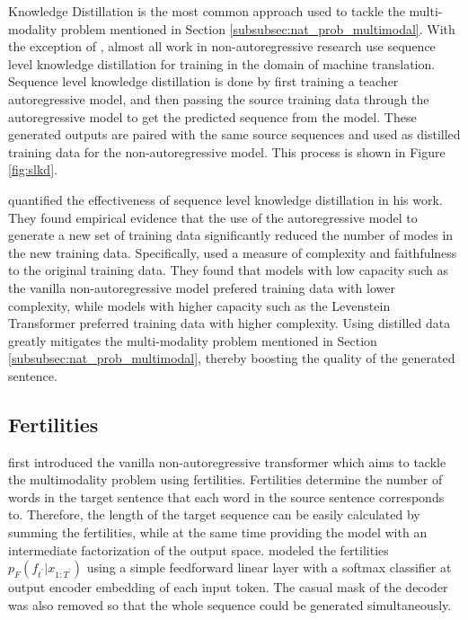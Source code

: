 Knowledge Distillation is the most common approach used to tackle the multi-modality problem mentioned in Section \ref{subsubsec:nat_prob_multimodal}. With the exception of \cite{ran_learning_to_recover_2020}, almost all work in non-autoregressive research \cite{ren_study_2020_comma, gu_non-autoregressive_2018, gu_levenshtein_2019, guo_non-autoregressive_2020_image_captioning, bao_non-autoregressive_2019_position_learning, wang_semi-autoregressive_2018,saharia_non-autoregressive_2020_latent_alignment, chan_kermit_2019, chan_multilingual_kermit, ghazvininejad_mask-predict_2019,stern_insertion_2019, zhou_improving_2020_with_monolingual_data, ran_guiding_2020_reordering, ma_flowseq_2019, qian_glancing_2020, guo_fine-tuning_2019_curriculum, ding_context-aware_2020} use sequence level knowledge distillation \cite{kim_sequence-level_2016_knowledge_distillation} for training in the domain of machine translation. Sequence level knowledge distillation is done by first training a teacher autoregressive model, and then passing the source training data through the autoregressive model to get the predicted sequence from the model. These generated outputs are paired with the same source sequences and used as distilled training data for the non-autoregressive model. This process is shown in Figure \ref{fig:slkd}.

\textcite{zhou_understanding_2020} quantified the effectiveness of sequence level knowledge distillation in his work. They found empirical evidence that the use of the autoregressive model to generate a new set of training data significantly reduced the number of modes in the new training data. Specifically, \textcite{zhou_understanding_2020} used a measure of complexity and faithfulness to the original training data. They found that models with low capacity such as the vanilla non-autoregressive model \cite{gu_non-autoregressive_2018} prefered training data with lower complexity, while models with higher capacity such as the Levenstein Transformer \cite{gu_levenshtein_2019} preferred training data with higher complexity. Using distilled data greatly mitigates the multi-modality problem mentioned in Section \ref{subsubsec:nat_prob_multimodal}, thereby boosting the quality of the generated sentence.

\subsection{Fertilities} \label{subsec:sol2_fertilities}
\textcite{gu_non-autoregressive_2018} first introduced the vanilla non-autoregressive transformer which aims to tackle the multimodality problem using fertilities. Fertilities determine the number of words in the target sentence that each word in the source sentence corresponds to. Therefore, the length of the target sequence can be easily calculated by summing the fertilities, while at the same time providing the model with an intermediate factorization of the output space. \textcite{gu_non-autoregressive_2018} modeled the fertilities $p_F(f_{t^\prime}|x_{1:T^\prime})$ using a simple feedforward linear layer with a softmax classifier at output encoder embedding of each input token. The casual mask of the decoder was also removed so that the whole sequence could be generated simultaneously. 

